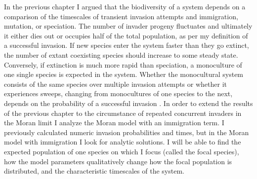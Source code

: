 In the previous chapter I argued that the biodiversity of a system depends on a comparison of the timescales of transient invasion attempts and immigration, mutation, or speciation. 
The number of invader progeny fluctuates and ultimately it either dies out or occupies half of the total population, as per my definition of a successful invasion. 
If new species enter the system faster than they go extinct, the number of extant coexisting species should increase to some steady state. %
Conversely, if extinction is much more rapid than speciation, a monoculture of one single species is expected in the system. 
Whether the monocultural system consists of the same species over multiple invasion attempts or whether it experiences sweeps, changing from monocultures of one species to the next, depends on the probability of a successful invasion \cite{Chesson1997,Chesson2000,Desai2007}. 
In order to extend the results of the previous chapter to the circumstance of repeated concurrent invaders in the Moran limit I analyze the Moran model with an immigration term. 
I previously calculated numeric invasion probabilities and times, but in the Moran model with immigration I look for analytic solutions. 
I will be able to find the expected population of one species on which I focus (called the focal species), how the model parameters qualitatively change how the focal population is distributed, and the characteristic timescales of the system. 

